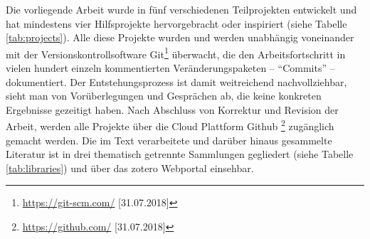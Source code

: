 \documentclass[openany,twoside,twocolumn]{book}
\let\rmarkdownfootnote\footnote%
\def\footnote{\protect\rmarkdownfootnote}
\begin{document}
Die vorliegende Arbeit wurde in fünf verschiedenen Teilprojekten
entwickelt und hat mindestens vier Hilfsprojekte hervorgebracht oder
inspiriert (siehe Tabelle \ref{tab:projects}). Alle diese Projekte
wurden und werden unabhängig voneinander mit der
Versionskontrollsoftware Git\footnote{\url{https://git-scm.com/}
  {[}31.07.2018{]}} überwacht, die den Arbeitsfortschritt in vielen
hundert einzeln kommentierten Veränderungspaketen -- ``Commits'' --
dokumentiert. Der Entstehungsprozess ist damit weitreichend
nachvollziehbar, sieht man von Vorüberlegungen und Gesprächen ab, die
keine konkreten Ergebnisse gezeitigt haben. Nach Abschluss von Korrektur
und Revision der Arbeit, werden alle Projekte über die Cloud Plattform
Github \footnote{\url{https://github.com/} {[}31.07.2018{]}} zugänglich
gemacht werden. Die im Text verarbeitete und darüber hinaus gesammelte
Literatur ist in drei thematisch getrennte Sammlungen gegliedert (siehe
Tabelle \ref{tab:libraries}) und über das zotero Webportal einsehbar.
\end{document}
